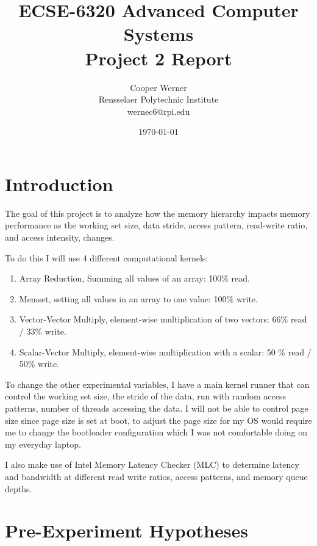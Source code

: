 \documentclass[11pt]{article}
\title{\textbf{ECSE-6320 Advanced Computer Systems \\ Project 2 Report}}
\author{Cooper Werner \\\small Rensselaer Polytechnic Institute \\ \small wernec6@rpi.edu}
\date{\today}
\begin{document}
\maketitle

\tableofcontents
\newpage

\section{Introduction}


The goal of this project is to analyze how the memory hierarchy impacts memory performance as the working set size,
data stride, access pattern, read-write ratio, and access intensity, changes.

To do this I will use 4 different computational kernels:

\begin{enumerate}
	\item Array Reduction, Summing all values of an array: 100\% read.
	\item Memset, setting all values in an array to one value: 100\% write.
	\item Vector-Vector Multiply, element-wise multiplication of two vectors: 66\% read / 33\% write.
	\item Scalar-Vector Multiply, element-wise multiplication with a scalar: 50 \% read / 50\% write.
\end{enumerate}

To change the other experimental variables, I have a main kernel runner that can control the working set size, the
stride of the data, run with random access patterns, number of threads accessing the data. I will not be able to
control page size since page size is set at boot, to adjust the page size for my OS would require me to change the
bootloader configuration which I was not comfortable doing on my everyday laptop.

I also make use of Intel Memory Latency Checker (MLC) to determine latency and bandwidth at different read write
ratios, access patterns, and memory queue depths.

\section{Pre-Experiment Hypotheses}
\end{document}
